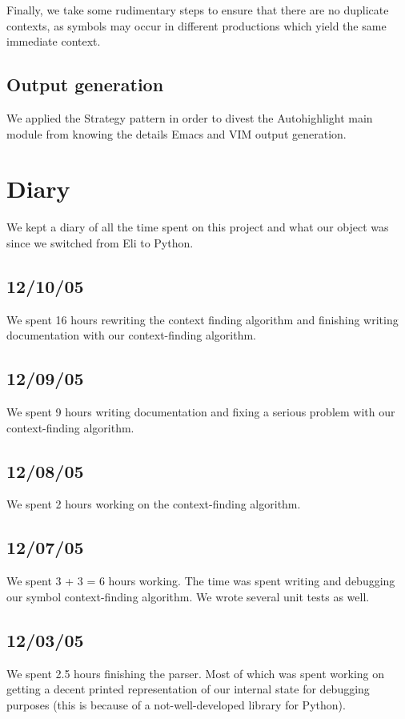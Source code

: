 \documentclass[]{article}
\begin{document}
  Finally, we take some rudimentary steps to ensure that there are no duplicate contexts, as symbols may occur in different productions which yield the same immediate context.

  \subsection{Output generation}
  We applied the Strategy pattern in order to divest the Autohighlight
  main module from knowing the details Emacs and VIM output
  generation.

  \section{Diary}
  We kept a diary of all the time spent on this project and what our
  object was since we switched from Eli to Python.
  
  \subsection{12/10/05}
  We spent 16 hours rewriting the context finding algorithm and finishing writing documentation
  with our context-finding algorithm.

  \subsection{12/09/05}
  We spent 9 hours writing documentation and fixing a serious problem
  with our context-finding algorithm.

  \subsection{12/08/05}
  We spent 2 hours working on the context-finding algorithm.
  
  \subsection{12/07/05}
  We spent 3 + 3 = 6 hours working. The time was spent writing and
  debugging our symbol context-finding algorithm. We wrote several unit
  tests as well.
  
  \subsection{12/03/05}
  We spent 2.5 hours finishing the parser. Most of which was spent
  working on getting a decent printed representation of our internal
  state for debugging purposes (this is because of a not-well-developed
  library for Python).
  
\end{document}
